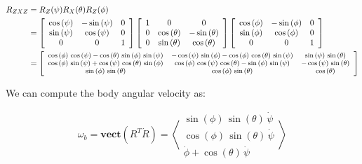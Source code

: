 \documentclass[12pt, letterpaper]{../assignment}
\begin{document}
\begin{equation*}
  \begin{aligned}
    R_{ZXZ} &= R_{Z}(\psi) R_{X}(\theta) R_{Z}(\phi) \\
    &= \left[\begin{array}{ccc} \cos\left(\psi \right) & -\sin\left(\psi \right) & 0\\ \sin\left(\psi \right) & \cos\left(\psi \right) & 0\\ 0 & 0 & 1 \end{array}\right]
    \left[\begin{array}{ccc} 1 & 0 & 0\\ 0 & \cos\left(\theta \right) & -\sin\left(\theta \right)\\ 0 & \sin\left(\theta \right) & \cos\left(\theta \right) \end{array}\right]
    \left[\begin{array}{ccc} \cos\left(\phi \right) & -\sin\left(\phi \right) & 0\\ \sin\left(\phi \right) & \cos\left(\phi \right) & 0\\ 0 & 0 & 1 \end{array}\right]\\
    &= \footnotesize{\left[\begin{array}{ccc}
            \cos \left(\phi \right)\,\cos \left(\psi \right)-\cos \left(\theta \right)\,\sin \left(\phi \right)\,\sin \left(\psi \right) & -\cos \left(\psi \right)\,\sin \left(\phi \right)-\cos \left(\phi \right)\,\cos \left(\theta \right)\,\sin \left(\psi \right) & \sin \left(\psi \right)\,\sin \left(\theta \right)\\
            \cos \left(\phi \right)\,\sin \left(\psi \right)+\cos \left(\psi \right)\,\cos \left(\theta \right)\,\sin \left(\phi \right) & \cos \left(\phi \right)\,\cos \left(\psi \right)\,\cos \left(\theta \right)-\sin \left(\phi \right)\,\sin \left(\psi \right) & -\cos \left(\psi \right)\,\sin \left(\theta \right)\\
            \sin \left(\phi \right)\,\sin \left(\theta \right) & \cos \left(\phi \right)\,\sin \left(\theta \right) & \cos \left(\theta \right)
            \end{array}\right]}
  \end{aligned}
\end{equation*}


We can compute the body angular velocity as:

$$ \omega_b = \textbf{vect}\left(  R^T \dot{R} \right) =
\left<\begin{array}{c} \sin\left(\phi \right)\,\sin\left(\theta \right)\,\dot{\psi} \\ \cos\left(\phi \right)\,\sin\left(\theta \right)\,\dot{\psi} \\ \dot{\phi} +\cos\left(\theta \right)\,\dot{\psi}  \end{array}\right>$$
\end{document}
